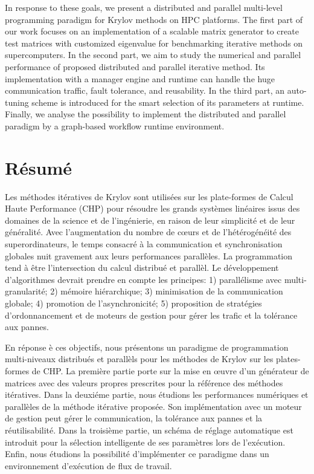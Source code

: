 \documentclass{xinzhewu}
\begin{document}
In response to these goals, we present a distributed and parallel multi-level programming paradigm for Krylov methods on HPC platforms. The first part of our work focuses on an implementation of a scalable matrix generator to create test matrices with customized eigenvalue for benchmarking iterative methods on supercomputers. In the second part, we aim to study the numerical and parallel performance of proposed distributed and parallel iterative method. Its implementation with a manager engine and runtime can handle the huge communication traffic, fault tolerance, and reusability. In the third part, an auto-tuning scheme is introduced for the smart selection of its parameters at runtime. Finally, we analyse the possibility to implement the distributed and parallel paradigm by a graph-based workflow runtime environment.

\clearemptydoublepage

\chapter*{R\'esum\'e}
\thispagestyle{empty}

Les m\'ethodes it\'eratives de Krylov sont utilis\'ees sur les plate-formes de Calcul Haute Performance (CHP) pour r\'esoudre les grands syst\`emes linéaires issus des domaines de la science et de l'ing\'enierie, en raison de leur simplicit\'e et de leur g\'en\'eralit\'e. Avec l'augmentation du nombre de cœurs et de l'h\'et\'erog\'en\'eit\'e des superordinateurs, le temps consacr\'e \`a la communication et synchronisation globales nuit gravement aux leurs performances parall\`eles. La programmation tend \`a \^etre l'intersection du calcul distribu\'e et parall\`el. Le d\'eveloppement d'algorithmes devrait prendre en compte les principes: 1) parall\'elisme avec multi-granularit\'e; 2) m\'emoire hi\'erarchique; 3) minimisation de la communication globale; 4) promotion de l'asynchronicit\'e; 5) proposition de strat\'egies d'ordonnancement et de moteurs de gestion pour g\'erer les trafic et la tol\'erance aux pannes.

En r\'eponse \`e ces objectifs, nous pr\'esentons un paradigme de programmation multi-niveaux distribu\'es et parall\`els pour les m\'ethodes de Krylov sur les plates-formes de CHP. La premi\`ere partie porte sur la mise en œuvre d'un g\'en\'erateur de matrices avec des valeurs propres prescrites pour la r\'ef\'erence des m\'ethodes it\'eratives. Dans la deuxi\'eme partie, nous \'etudions les performances num\'eriques et parall\`eles de la m\'ethode it\'erative propos\'ee. Son impl\'ementation avec un moteur de gestion peut g\'erer le communication, la tol\'erance aux pannes et la réutilisabilit\'e. Dans la troisi\`eme partie, un sch\'ema de r\'eglage automatique est introduit pour la s\'election intelligente de ses param\`etres lors de l'ex\'ecution. Enfin, nous \'etudions la possibilit\'e d'impl\'ementer ce paradigme dans un environnement d'ex\'ecution de flux de travail.
\end{document}
